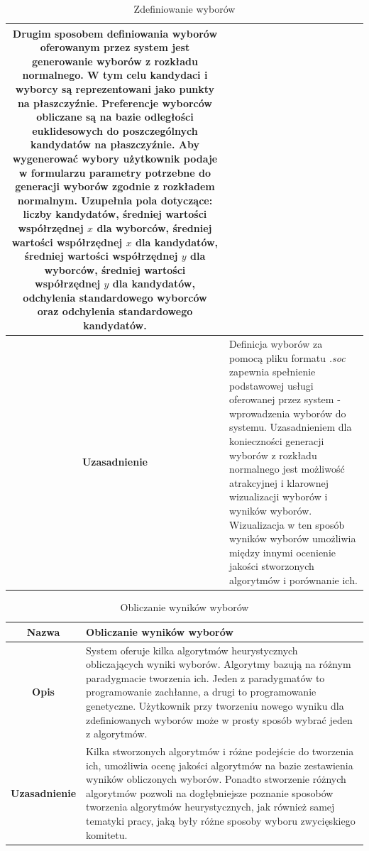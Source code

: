 \documentclass[polish,11pt]{aghthesis}
\begin{document}
\begin{table}
\begin{tabular}{|c|p{13cm}|}
Drugim sposobem definiowania wyborów oferowanym przez system
jest generowanie wyborów z rozkładu normalnego. W tym celu
kandydaci i wyborcy są reprezentowani jako punkty na płaszczyźnie.
Preferencje wyborców obliczane są na bazie odległości euklidesowych
do poszczególnych kandydatów na płaszczyźnie. Aby wygenerować
wybory użytkownik podaje w formularzu parametry potrzebne do
generacji wyborów zgodnie z rozkładem normalnym. Uzupełnia pola
dotyczące: liczby kandydatów, średniej wartości współrzędnej $x$ dla
wyborców, średniej wartości współrzędnej $x$ dla kandydatów, średniej
wartości współrzędnej $y$ dla wyborców, średniej wartości współrzędnej
$y$ dla kandydatów, odchylenia standardowego wyborców oraz
odchylenia standardowego kandydatów. \\ 
\hline 
\textbf{Uzasadnienie} & Definicja wyborów za pomocą pliku formatu \textit{.soc} zapewnia spełnienie
podstawowej usługi oferowanej przez system - wprowadzenia wyborów
do systemu. Uzasadnieniem dla konieczności generacji wyborów z
rozkładu normalnego jest możliwość atrakcyjnej i klarownej wizualizacji
wyborów i wyników wyborów. Wizualizacja w ten sposób wyników
wyborów umożliwia między innymi ocenienie jakości stworzonych
algorytmów i porównanie ich.\\ 
\hline 
\end{tabular}
\caption{Zdefiniowanie wyborów} 
\end{table}

\begin{table}
\centering
\begin{tabular}{|c|p{10cm}|}
\hline
\textbf{Nazwa} & Obliczanie wyników wyborów \\ 
\hline 
\textbf{Opis} & System oferuje kilka algorytmów heurystycznych obliczających wyniki
wyborów. Algorytmy bazują na różnym paradygmacie tworzenia ich.
Jeden z paradygmatów to programowanie zachłanne, a drugi to
programowanie genetyczne. Użytkownik przy tworzeniu
nowego wyniku dla zdefiniowanych wyborów może w prosty sposób
wybrać jeden z algorytmów. \\ 
\hline 
\textbf{Uzasadnienie} & Kilka stworzonych algorytmów i różne podejście do tworzenia ich,
umożliwia ocenę jakości algorytmów na bazie zestawienia wyników
obliczonych wyborów. Ponadto stworzenie różnych algorytmów pozwoli
na dogłębniejsze poznanie sposobów tworzenia algorytmów
heurystycznych, jak również samej tematyki pracy, jaką były różne
sposoby wyboru zwycięskiego komitetu.\\ 
\hline 
\end{tabular}
\caption{Obliczanie wyników wyborów} 
\end{table}
\clearpage
\end{document}
